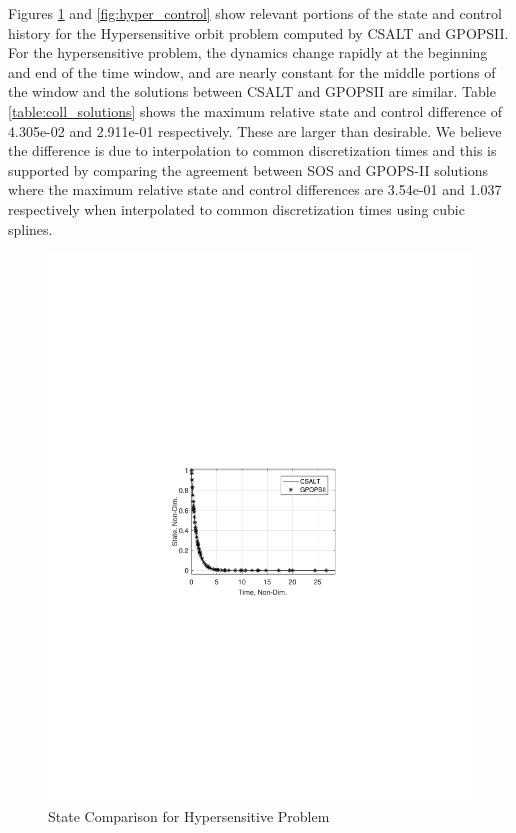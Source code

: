 \documentclass[ISTS  ]{tjsass} %
\begin{document}
Figures \ref{fig:hyper_state} and  \ref{fig:hyper_control} show relevant portions of the state and control history for the Hypersensitive orbit problem computed by CSALT and GPOPSII.  For the hypersensitive problem, the dynamics change rapidly at the beginning and end of the time window, and are nearly constant for the middle portions of the window and the solutions between CSALT and GPOPSII are similar. Table \ref{table:coll_solutions} shows the maximum relative state and control difference of 4.305e-02 and 2.911e-01 respectively. These are larger than desirable.  We believe the difference is due to interpolation to common discretization times and this is supported by comparing the agreement between SOS and GPOPS-II solutions where the maximum relative state and control differences are 3.54e-01 and 1.037 respectively when interpolated to common discretization times using cubic splines.
%
\begin{figure}[h]
    \centering
    \includegraphics[width=\columnwidth]{../Figures/HyperSensitive_StateCompare}
    \caption{State Comparison for Hypersensitive Problem}
    \label{fig:hyper_state}
\end{figure}
\end{document}
